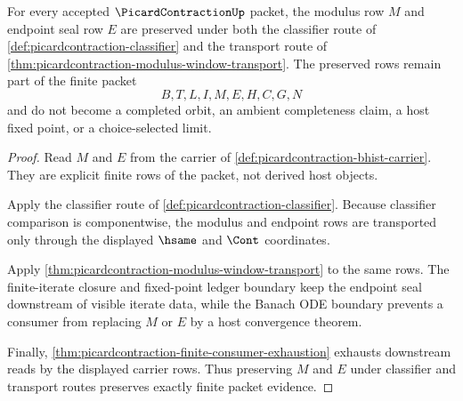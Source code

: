 \begin{theorem}
\label{thm:picardcontraction-modulus-window-row-scope}
For every accepted $\PicardContractionUp$ packet, the modulus row $M$ and endpoint seal row $E$ are preserved under both the classifier route of \autoref{def:picardcontraction-classifier} and the transport route of \autoref{thm:picardcontraction-modulus-window-transport}. The preserved rows remain part of the finite packet
$$
B,T,L,I,M,E,H,C,G,N
$$
and do not become a completed orbit, an ambient completeness claim, a host fixed point, or a choice-selected limit.
\end{theorem}
\begin{proof}
Read $M$ and $E$ from the carrier of \autoref{def:picardcontraction-bhist-carrier}. They are explicit finite rows of the packet, not derived host objects.

Apply the classifier route of \autoref{def:picardcontraction-classifier}. Because classifier comparison is componentwise, the modulus and endpoint rows are transported only through the displayed $\hsame$ and $\Cont$ coordinates.

Apply \autoref{thm:picardcontraction-modulus-window-transport} to the same rows. The finite-iterate closure and fixed-point ledger boundary keep the endpoint seal downstream of visible iterate data, while the Banach ODE boundary prevents a consumer from replacing $M$ or $E$ by a host convergence theorem.

Finally, \autoref{thm:picardcontraction-finite-consumer-exhaustion} exhausts downstream reads by the displayed carrier rows. Thus preserving $M$ and $E$ under classifier and transport routes preserves exactly finite packet evidence.
\end{proof}

